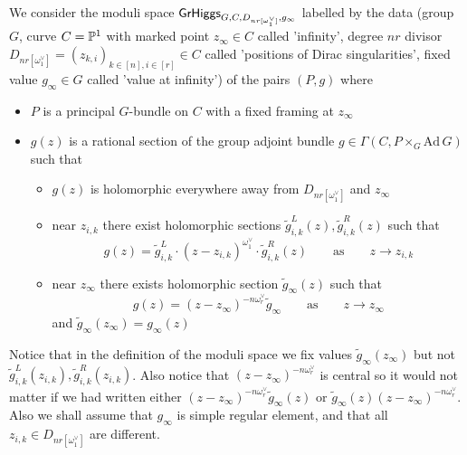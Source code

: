 \documentclass[12pt,psamsfonts,reqno]{amsart}
\begin{document}
\begin{definition} \label{de:GLrn}
  
  We consider the moduli space $\mathsf{GrHiggs}_{G,C,D_{nr[\omega_1^{\vee}]},g_\infty}$  
  labelled by the data (group $G$, curve $C = \mathbb P^1$ with marked point $z_\infty \in C$ called 'infinity',
  degree $nr$ divisor $D_{nr[\omega_1^{\vee}]} = (z_{k,i})_{k \in [n], i \in [r]} \in C$ called
  'positions of Dirac singularities', fixed value $g_{\infty} \in G$ called 'value at infinity') of the pairs
  $(P,g)$ where 
\begin{itemize}
\item $P$ is a principal $G$-bundle on $C$ with a fixed framing at $z_{\infty}$
\item $g(z)$ is a rational section of the group adjoint bundle $g \in \Gamma(C, P \times_{G} \mathrm{Ad} \, G)$
  such that 
  \begin{itemize}
  \item $g(z)$ is holomorphic everywhere away from $D_{nr[\omega_1^{\vee}]}$ and $z_\infty$
  \item near $z_{i,k}$ there exist holomorphic sections $\tilde g_{i,k}^{L}(z), \tilde g_{i,k}^{R}(z) $ such that
    \begin{equation}
     g(z) = \tilde g_{i,k}^{L} \cdot (z - z_{i,k})^{\omega_1^{\vee}} \cdot \tilde g_{i,k}^{R} (z) \qquad \text{as} \qquad z \to z_{i,k}
    \end{equation}
 \item near $z_{\infty}$ there exists holomorphic section $\tilde g_{\infty}(z)$
   such that 
   \begin{equation}
     g(z) = (z-z_{\infty})^{-n \omega_{r}^{\vee}} \tilde g_{\infty} \qquad \text{as} \qquad z \to z_\infty
   \end{equation}
   and $\tilde g_\infty(z_{\infty}) = g_\infty(z)$
  \end{itemize}
\end{itemize}
\end{definition}


Notice that in the definition of the moduli space we fix values $\tilde g_{\infty}(z_\infty)$ but not $\tilde g_{i,k}^{L}(z_{i,k}), \tilde g_{i,k}^{R}(z_{i,k})$. Also notice that $(z - z_\infty)^{-n\omega_r^{\vee}}$ is central so it would not matter if we had written either $(z-z_{\infty})^{-n \omega_{r}^{\vee}} \tilde g_{\infty}(z)$ or $\tilde g_{\infty}(z) (z-z_{\infty})^{-n \omega_{r}^{\vee}}$. Also we shall assume that $g_{\infty}$ is simple regular element, and that all $z_{i,k} \in D_{nr[\omega_1^{\vee}]}$ are
different. 
\end{document}
